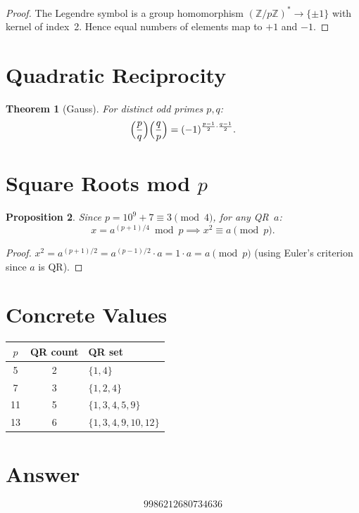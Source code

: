 \documentclass[11pt]{article}
\newtheorem{theorem}{Theorem}
\newtheorem{proposition}[theorem]{Proposition}
\begin{document}
\begin{proof}
The Legendre symbol is a group homomorphism $(\mathbb{Z}/p\mathbb{Z})^* \to \{\pm 1\}$ with kernel of index~2. Hence equal numbers of elements map to $+1$ and $-1$.
\end{proof}

\section{Quadratic Reciprocity}

\begin{theorem}[Gauss]
For distinct odd primes $p, q$:
\[
\Bigl(\frac{p}{q}\Bigr)\Bigl(\frac{q}{p}\Bigr) = (-1)^{\frac{p-1}{2}\cdot\frac{q-1}{2}}.
\]
\end{theorem}

\section{Square Roots mod $p$}

\begin{proposition}
Since $p = 10^9 + 7 \equiv 3 \pmod{4}$, for any QR~$a$:
\[
x = a^{(p+1)/4} \bmod p \implies x^2 \equiv a \pmod{p}.
\]
\end{proposition}

\begin{proof}
$x^2 = a^{(p+1)/2} = a^{(p-1)/2} \cdot a = 1 \cdot a = a \pmod{p}$ (using Euler's criterion since $a$ is QR).
\end{proof}

\section{Concrete Values}

\begin{center}
\begin{tabular}{ccl}
\toprule
$p$ & QR count & QR set \\
\midrule
5  & 2 & $\{1, 4\}$ \\
7  & 3 & $\{1, 2, 4\}$ \\
11 & 5 & $\{1, 3, 4, 5, 9\}$ \\
13 & 6 & $\{1, 3, 4, 9, 10, 12\}$ \\
\bottomrule
\end{tabular}
\end{center}

\section{Answer}

\[
\boxed{9986212680734636}
\]
\end{document}
